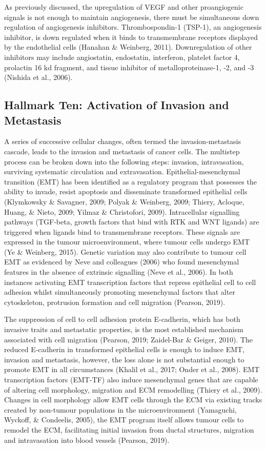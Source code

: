 \documentclass[a4paper, twoside]{templates/ociamthesis}
\begin{document}
As previously discussed, the upregulation of VEGF and other proangiogenic signals is not enough to maintain angiogenesis, there must be simultaneous down regulation of angiogenesis inhibitors. Thrombospondin-1 (TSP-1), an angiogenesis inhibitor, is down regulated when it binds to transmembrane receptors displayed by the endothelial cells (Hanahan \& Weinberg, 2011). Downregulation of other inhibitors may include angiostatin, endostatin, interferon, platelet factor 4, prolactin 16 kd fragment, and tissue inhibitor of metalloproteinase-1, -2, and -3 (Nishida et al., 2006).

\hypertarget{hallmark-ten-activation-of-invasion-and-metastasis}{%
\subsection{Hallmark Ten: Activation of Invasion and Metastasis}\label{hallmark-ten-activation-of-invasion-and-metastasis}}

A series of successive cellular changes, often termed the invasion-metastasis cascade, leads to the invasion and metastasis of cancer cells. The multistep process can be broken down into the following steps: invasion, intravasation, surviving systematic circulation and extravasation. Epithelial-mesenchymal transition (EMT) has been identified as a regulatory program that possesses the ability to invade, resist apoptosis and disseminate transformed epithelial cells (Klymkowsky \& Savagner, 2009; Polyak \& Weinberg, 2009; Thiery, Acloque, Huang, \& Nieto, 2009; Yilmaz \& Christofori, 2009). Intracellular signalling pathways (TGF-beta, growth factors that bind with RTK and WNT ligands) are triggered when ligands bind to transmembrane receptors. These signals are expressed in the tumour microenvironment, where tumour cells undergo EMT (Ye \& Weinberg, 2015). Genetic variation may also contribute to tumour cell EMT as evidenced by Neve and colleagues (2006) who found mesenchymal features in the absence of extrinsic signalling (Neve et al., 2006). In both instances activating EMT transcription factors that repress epithelial cell to cell adhesion whilst simultaneously promoting mesenchymal factors that alter cytoskeleton, protrusion formation and cell migration (Pearson, 2019).

The suppression of cell to cell adhesion protein E-cadherin, which has both invasive traits and metastatic properties, is the most established mechanism associated with cell migration (Pearson, 2019; Zaidel-Bar \& Geiger, 2010). The reduced E-cadherin in transformed epithelial cells is enough to induce EMT, invasion and metastasis, however, the loss alone is not substantial enough to promote EMT in all circumstances (Khalil et al., 2017; Onder et al., 2008). EMT transcription factors (EMT-TF) also induce mesenchymal genes that are capable of altering cell morphology, migration and ECM remodelling (Thiery et al., 2009). Changes in cell morphology allow EMT cells through the ECM via existing tracks created by non-tumour populations in the microenvironment (Yamaguchi, Wyckoff, \& Condeelis, 2005), the EMT program itself allows tumour cells to remodel the ECM, facilitating initial invasion from ductal structures, migration and intravasation into blood vessels (Pearson, 2019).
\end{document}

